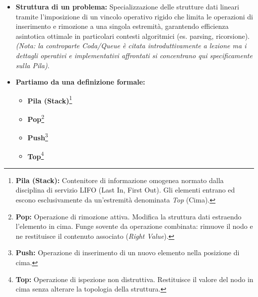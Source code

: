 \documentclass[a4paper, 11pt]{report}
\newcommand{\definizione}[2]{%
\textbf{#1}\footnote{\textbf{#1:} #2}%
}
\begin{document}
\begin{itemize}
    \item \textbf{Struttura di un problema:}
    Specializzazione delle strutture dati lineari tramite l'imposizione di un vincolo operativo rigido che limita le operazioni di inserimento e rimozione a una singola estremità, garantendo efficienza asintotica ottimale in particolari contesti algoritmici (es. parsing, ricorsione). \textit{(Nota: la controparte Coda/Queue è citata introduttivamente a lezione ma i dettagli operativi e implementativi affrontati si concentrano qui specificamente sulla Pila)}.

    \item \textbf{Partiamo da una definizione formale:}
    \begin{itemize}
        \item \definizione{Pila (Stack)}{Contenitore di informazione omogenea normato dalla disciplina di servizio LIFO (Last In, First Out). Gli elementi entrano ed escono esclusivamente da un'estremità denominata \textit{Top} (Cima).}
        \item \definizione{Pop}{Operazione di rimozione attiva. Modifica la struttura dati estraendo l'elemento in cima. Funge sovente da operazione combinata: rimuove il nodo e ne restituisce il contenuto associato (\textit{Right Value}).}
        \item \definizione{Push}{Operazione di inserimento di un nuovo elemento nella posizione di cima.}
        \item \definizione{Top}{Operazione di ispezione non distruttiva. Restituisce il valore del nodo in cima senza alterare la topologia della struttura.}
    \end{itemize}


\end{itemize}
\end{document}
